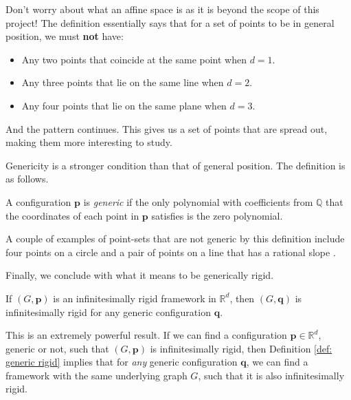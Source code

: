 \begin{flushleft}
Don't worry about what an affine space is as it is beyond the scope of this project! The definition essentially says that for a set of points to be in general position, we must \textbf{not} have:
\begin{itemize}
    \item Any two points that coincide at the same point when $d = 1$.
    \vspace{-3mm}
    \item Any three points that lie on the same line when $d = 2$.
    \vspace{-3mm}
    \item Any four points that lie on the same plane when $d = 3$.
\end{itemize}

And the pattern continues. This gives us a set of points that are spread out, making them more interesting to study.
\end{flushleft}

\begin{flushleft}
Genericity is a stronger condition than that of general position. The definition is as follows.
\end{flushleft}

\begin{definition}
A configuration $\mathbf{p}$ is \textit{generic} if the only polynomial with coefficients from $\mathbb{Q}$ that the coordinates of each point in $\mathbf{p}$ satisfies is the zero polynomial.
\end{definition}

\begin{flushleft}
A couple of examples of point-sets that are not generic by this definition include four points on a circle and a pair of points on a line that has a rational slope \cite{textbook}.

Finally, we conclude with what it means to be generically rigid.    
\end{flushleft}

\begin{theorem}
\label{def: generic rigid}
If $(G,\mathbf{p})$ is an infinitesimally rigid framework in $\mathbb{R}^d$, then $(G,\mathbf{q})$ is infinitesimally rigid for any generic configuration $\mathbf{q}$.
\end{theorem}

\begin{flushleft}
This is an extremely powerful result. If we can find a configuration $\mathbf{p} \in \mathbb{R}^d$, generic or not, such that $(G,\mathbf{p})$ is infinitesimally rigid, then Definition \ref{def: generic rigid} implies that for \textit{any} generic configuration $\mathbf{q}$, we can find a framework with the same underlying graph $G$, such that it is also infinitesimally rigid.
\end{flushleft}


